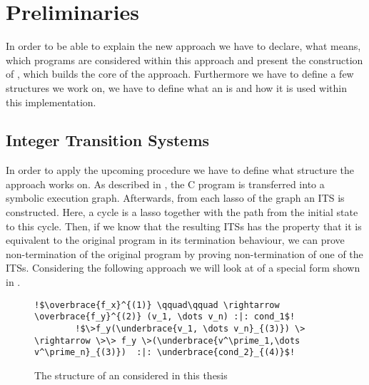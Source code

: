 \chapter{Preliminaries}
\label{chapter:preliminaries}

In order to be able to explain the new \nonterm approach we have to declare, what \nonterm means, which programs are considered within this approach and present the construction of \gnas, which builds the core of the approach. Furthermore we have to define a few structures we work on, we have to define what an \solver is and how it is used within this implementation.


\section{Integer Transition Systems}
\label{sec:its}
In order to apply the upcoming procedure we have to define what structure the approach works on. As described in , the C program is transferred into a symbolic execution graph. Afterwards, from each lasso of the graph an ITS is constructed. Here, a cycle is a lasso together with the path from the initial state to this cycle. Then, if we know that the resulting ITSs has the property that it is equivalent to the original program in its termination behaviour, we can prove non-termination of the original program by proving non-termination of one of the ITSs. Considering the following approach we will look at \itss of a special form shown in .\newline
\begin{figure}[H]
	\begin{lstlisting}[escapechar=!]
		!$\overbrace{f_x}^{(1)} \qquad\qquad \rightarrow \overbrace{f_y}^{(2)} (v_1, \dots v_n) :|: cond_1$!
		!$\>f_y(\underbrace{v_1, \dots v_n}_{(3)}) \> \rightarrow \>\> f_y \>(\underbrace{v^\prime_1,\dots v^\prime_n}_{(3)})  :|: \underbrace{cond_2}_{(4)}$!
	\end{lstlisting}
	\caption{The structure of an \its considered in this thesis}
	\label{fig:its-structure}
\end{figure}

